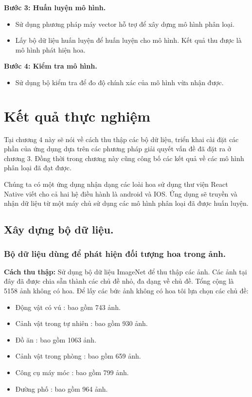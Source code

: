\documentclass[12pt]{report}
\begin{document}
		\textbf{Bước 3: Huấn luyện mô hình.} 
		\begin{itemize}
			\item Sử dụng phương pháp máy vector hỗ trợ để xây dựng mô hình phân loại.
			\item Lấy bộ dữ liệu huấn luyện để huấn luyện cho mô hình. Kết quả thu được là mô hình phát hiện hoa.
		\end{itemize}
										
		\textbf{Bước 4: Kiểm tra mô hình.} 
		\begin{itemize}
			\item Sử dụng bộ kiểm tra để đo độ chính xác của mô hình vừa nhận được.
		\end{itemize}
											
		\chapter{Kết quả thực nghiệm}
		\label{chap:Experimental results}
		Tại chương 4 này sẽ nói về cách thu thập các bộ dữ liệu, triển khai cài đặt các phần của ứng dụng dựa trên các phương pháp giải quyết vấn đề đã đặt ra ở chương 3.
		Đồng thời trong chương này cũng công bố các kết quả về các mô hình phân loại đã đạt được.
		
		Chúng ta có một ứng dụng nhận dạng các loài hoa sử dụng thư viện React Native viết cho cả hai hệ điều hành là android và IOS. Ứng dụng sẽ truyền và nhận dữ liệu từ một máy chủ sử dụng các mô hình phân loại đã được huấn luyện. 
										
		\section{Xây dựng bộ dữ liệu.}
		\subsection{Bộ dữ liệu dùng để phát hiện đối tượng hoa trong ảnh.}
										
		\textbf{Cách thu thập:} Sử dụng bộ dữ liệu ImageNet để thu thập các ảnh. 
		Các ảnh tại đây đã được chia sẵn thành các chủ đề nhỏ, 
		đa dạng về chủ đề. Tổng cộng là 5158 ảnh không có hoa. 
		Để lấy các bức ảnh không có hoa tôi lựa chọn các chủ đề: 
		\begin{itemize}
			\item Động vật có vú		: bao gồm 743 ảnh.
			\item Cảnh vật trong tự nhiên	: bao gồm 930 ảnh.
			\item Đồ ăn			: bao gồm 1063 ảnh.
			\item Cảnh vật trong phòng	: bao gồm 659 ảnh.
			\item Công cụ máy móc		: bao gồm 799 ảnh.
			\item Đường phố			: bao gồm 964 ảnh.
		\end{itemize}	
											
\end{document}

